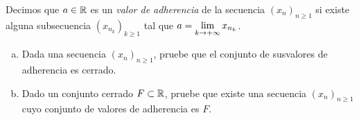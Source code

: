 
Decimos que $a\in\mathbb{R}$ es un \emph{valor de adherencia} de la secuencia $(x_n)_{n\geq 1}$ si existe alguna subsecuencia $(x_{n_k})_{k\geq 1}$ tal que $a = \limite{k}{x_{n_k}}$.

\begin{enumerate}[a)]
	
	\item Dada una secuencia $(x_n)_{n\geq 1}$, pruebe que el conjunto de susvalores de adherencia es cerrado.
	
	\item Dado un conjunto cerrado $F\subset\mathbb{R}$, pruebe que existe una secuencia $(x_n)_{n\geq 1}$ cuyo conjunto de valores de adherencia es $F$.

\end{enumerate}